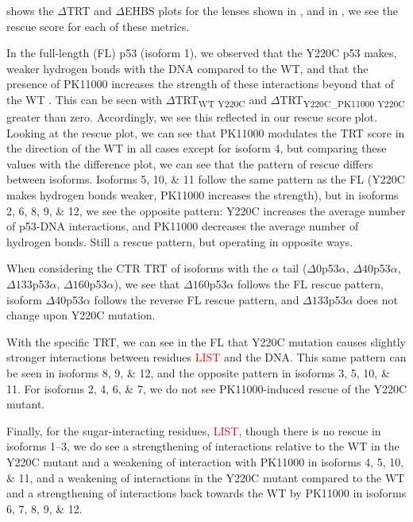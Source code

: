  shows the \(\Delta\)TRT and \(\Delta\)EHBS plots for the lenses shown in , and in , we see the rescue score for each of these metrics.


In the full-length (FL) p53 (isoform \num{1}), we observed that the Y220C p53 makes, weaker hydrogen bonds with the DNA compared to the WT, and that the presence of PK11000 increases the strength of these interactions beyond that of the WT \parencite{stetsonRestorationY220CP532025}. This can be seen with \(\Delta\)TRT\textsubscript{WT \textminus{} Y220C} and \(\Delta\)TRT\textsubscript{Y220C\_PK11000 \textminus{} Y220C} greater than zero.  Accordingly, we see this reflected in our rescue score plot. Looking at the rescue plot, we can see that PK11000 modulates the TRT score in the direction of the WT in all cases except for isoform \num{4}, but comparing these values with the difference plot, we can see that the pattern of rescue differs between isoforms. Isoforms \numlist{5;10;11} follow the same pattern as the FL (Y220C makes hydrogen bonds weaker, PK11000 increases the strength), but in isoforms \numlist{2;6;8;9;12}, we see the opposite pattern: Y220C increases the average number of p53-DNA interactions, and PK11000 decreases the average number of hydrogen bonds. Still a rescue pattern, but operating in opposite ways.

When considering the CTR TRT of isoforms with the \(\alpha\) tail (\(\Delta0\)p53\(\alpha\), \(\Delta40\)p53\(\alpha\), \(\Delta133\)p53\(\alpha\), \(\Delta160\)p53\(\alpha\)), we see that \(\Delta160\)p53\(\alpha\) follows the FL rescue pattern, isoform \(\Delta40\)p53\(\alpha\) follows the reverse FL rescue pattern, and \(\Delta133\)p53\(\alpha\) does not change upon Y220C mutation.

With the specific TRT, we can see in the FL that Y220C mutation causes slightly stronger interactions between residues \textcolor{red}{LIST} and the DNA. This same pattern can be seen in isoforms \numlist{8;9;12}, and the opposite pattern in isoforms \numlist{3;5;10;11}. For isoforms \numlist{2;4;6;7}, we do not see PK11000-induced rescue of the Y220C mutant.

Finally, for the sugar-interacting residues, \textcolor{red}{LIST}, though there is no rescue in isoforms \numrange{1}{3}, we do see a strengthening of interactions relative to the WT in the Y220C mutant and a weakening of interaction with PK11000 in isoforms \numlist{4;5;10;11}, and a weakening of interactions in the Y220C mutant compared to the WT and a strengthening of interactions back towards the WT by PK11000 in isoforms \numlist{6;7;8;9;12}.

